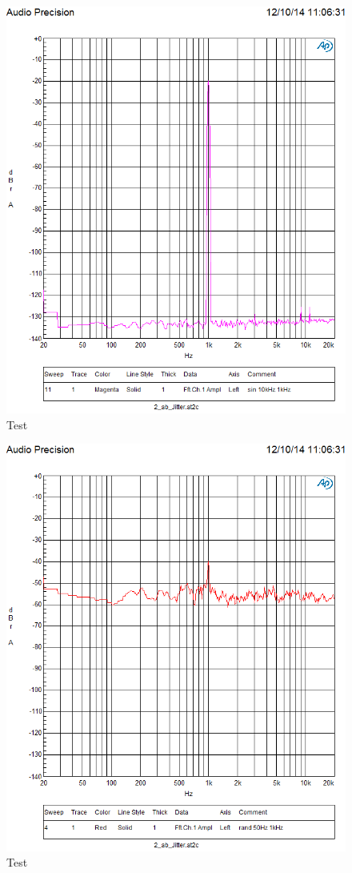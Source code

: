 \begin{figure}
\centering
\includegraphics[width=\columnwidth]{figures/Aufg2/11.PNG} 
\caption{Test}
\end{figure}


\begin{figure}
\centering
\includegraphics[width=\columnwidth]{figures/Aufg2/4.PNG} 
\caption{Test}
\end{figure}


